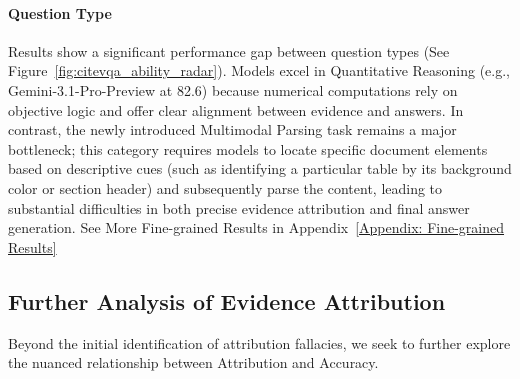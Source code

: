 \documentclass[]{opendatalab}
\begin{document}
{\paragraph{Question Type} Results show a significant performance gap between question types (See Figure~\ref{fig:citevqa_ability_radar}). Models excel in Quantitative Reasoning (e.g., Gemini-3.1-Pro-Preview at 82.6) because numerical computations rely on objective logic and offer clear alignment between evidence and answers. In contrast, the newly introduced Multimodal Parsing task remains a major bottleneck; this category requires models to locate specific document elements based on descriptive cues (such as identifying a particular table by its background color or section header) and subsequently parse the content, leading to substantial difficulties in both precise evidence attribution and final answer generation. See More Fine-grained Results in Appendix~\ref{Appendix: Fine-grained Results}

\subsection{Further Analysis of Evidence Attribution}

Beyond the initial identification of attribution fallacies, we seek to further explore the nuanced relationship between Attribution and Accuracy.


\begin{table}[htbp]
 \centering
 \scriptsize


\end{table}}
\end{document}
